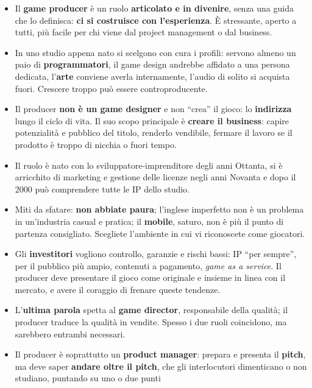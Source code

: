 \begin{itemize}
  \item Il \textbf{game producer} è un ruolo \textbf{articolato e in divenire},
        senza una guida che lo definisca: \textbf{ci si costruisce con
        l'esperienza}. È stressante, aperto a tutti, più facile per chi viene dal
        project management o dal business.
  \item In uno studio appena nato si scelgono con cura i profili: servono almeno
        un paio di \textbf{programmatori}, il game design andrebbe affidato a una
        persona dedicata, l'\textbf{arte} conviene averla internamente, l'audio di
        solito si acquista fuori. Crescere troppo può essere controproducente.
  \item Il producer \textbf{non è un game designer} e non ``crea'' il gioco:
        lo \textbf{indirizza} lungo il ciclo di vita. Il suo scopo principale è
        \textbf{creare il business}: capire potenzialità e pubblico del titolo,
        renderlo vendibile, fermare il lavoro se il prodotto è troppo di nicchia
        o fuori tempo.
  \item Il ruolo è nato con lo sviluppatore-imprenditore degli anni Ottanta, si è
        arricchito di marketing e gestione delle licenze negli anni Novanta e
        dopo il 2000 può comprendere tutte le IP dello studio.
  \item Miti da sfatare: \textbf{non abbiate paura}; l'inglese imperfetto non è
        un problema in un'industria casual e pratica; il \textbf{mobile}, saturo,
        non è più il punto di partenza consigliato. Scegliete l'ambiente in cui vi
        riconoscete come giocatori.
  \item Gli \textbf{investitori} vogliono controllo, garanzie e rischi bassi: IP
        ``per sempre'', per il pubblico più ampio, contenuti a pagamento,
        \emph{game as a service}. Il producer deve presentare il gioco come
        originale e insieme in linea con il mercato, e avere il coraggio di
        frenare queste tendenze.
  \item L'\textbf{ultima parola} spetta al \textbf{game director}, responsabile
        della qualità; il producer traduce la qualità in vendite. Spesso i due
        ruoli coincidono, ma sarebbero entrambi necessari.
  \item Il producer è soprattutto un \textbf{product manager}: prepara e presenta
        il \textbf{pitch}, ma deve saper \textbf{andare oltre il pitch}, che gli
        interlocutori dimenticano o non studiano, puntando su uno o due punti

\end{itemize}
